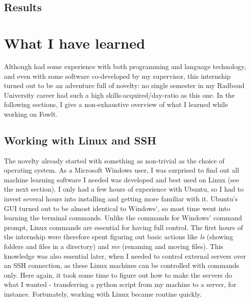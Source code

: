 \documentclass[12pt]{article}
\begin{document}
\subsection{Results}

\section{What I have learned}
Although had some experience with both programming and language technology, and even with some software co-developed by my supervisor, this internship turned out to be an adventure full of novelty: no single semester in my Radboud University career had such a high skills-acquired/day-ratio as this one. In the following sections, I give a non-exhaustive overview of what I learned while working on Fowlt.

\subsection{Working with Linux and SSH}
The novelty already started with something as non-trivial as the choice of operating system. As a Microsoft Windows user, I was surprised to find out all machine learning software I needed was developed and best used on Linux (see the next section). I only had a few hours of experience with Ubuntu, so I had to invest several hours into installing and getting more familiar with it. Ubuntu's GUI turned out to be almost identical to Windows', so most time went into learning the terminal commands. Unlike the commands for Windows' command prompt, Linux commands are essential for having full control. The first hours of the internship were therefore spent figuring out basic actions like \emph{ls} (showing folders and files in a directory) and \emph{mv} (renaming and moving files). This knowledge was also essential later, when I needed to control external servers over an SSH connection, as these Linux machines can be controlled with commands only. Here again, it took some time to figure out how to make the servers do what I wanted - transferring a python script from my machine to a server, for instance. Fortunately, working with Linux became routine quickly.

\end{document}
